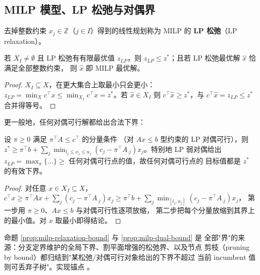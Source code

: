 \subsection{MILP 模型、LP 松弛与对偶界}

\begin{definition}[LP 松弛]
去掉整数约束 $x_j \in \mathbb{Z}$（$j \in I$）得到的线性规划称为 MILP 的
\textbf{LP 松弛}（LP relaxation）。
\end{definition}

\begin{proposition}[松弛界]
\label{prop:milp-relaxation-bound}
若 $X_I \neq \emptyset$ 且 LP 松弛有有限最优值 $z_{LP}$，则
$z_{LP} \le z^*$；且若 LP 松弛最优解 $\hat x$ 恰满足全部整数约束，
则 $\hat x$ 即 MILP 最优解。
\end{proposition}
\begin{proof}
$X_I \subseteq X$，在更大集合上取最小只会更小：$z_{LP} = \min_{X} c^\top x
\le \min_{X_I} c^\top x = z^*$。若 $\hat x \in X_I$ 则
$c^\top \hat x \ge z^*$，与 $c^\top \hat x = z_{LP} \le z^*$ 合并得等号。
\end{proof}

更一般地，任何对偶可行解都给出合法下界：

\begin{proposition}[对偶界]
\label{prop:milp-dual-bound}
设 $\pi \ge 0$ 满足 $\pi^\top A \le c^\top$ 的分量条件
（对 $Ax \le b$ 型约束的 LP 对偶可行），则
$z^* \ge \pi^\top b + \sum_j \min_{l_j \le x_j \le u_j}
(c_j - \pi^\top A_{\cdot j}) x_j$。特别地 LP 弱对偶给出
$z_{LP} = \max_\pi \{\ldots\} \ge$ 任何对偶可行点的值，故任何对偶可行点的
目标值都是 $z^*$ 的有效下界。
\end{proposition}
\begin{proof}
对任意 $x \in X_I \subseteq X$，
$c^\top x \ge \pi^\top A x + \sum_j (c_j - \pi^\top A_{\cdot j}) x_j
\ge \pi^\top b + \sum_j \min_{[l_j,u_j]}(c_j - \pi^\top A_{\cdot j}) x_j$，
第一步用 $\pi \ge 0$、$Ax \le b$ 与对偶可行性逐项放缩，
第二步把每个分量放缩到其界上的最小值。对 $x$ 取最小即得结论。
\end{proof}

\begin{remark}
命题 \ref{prop:milp-relaxation-bound} 与 \ref{prop:milp-dual-bound} 是
全部"界"的来源：分支定界维护的全局下界、割平面增强的松弛界、以及节点
剪枝（pruning by bound）都归结到"某松弛/对偶可行对象给出的下界不超过
当前 incumbent 值则可丢弃子树"。实现锚点
。
\end{remark}

